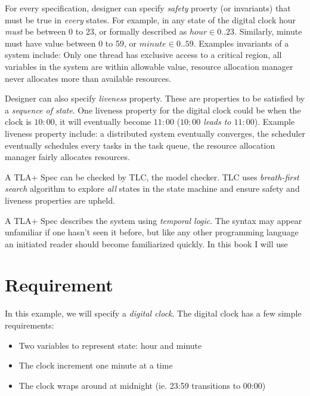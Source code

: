 \documentclass{report}
\begin{document}
For every specification, designer can specify \textit{safety} proerty (or
invariants) that must be true in \textit{every} states. For example, in any
state of the digital clock hour \textit{must} be between 0 to 23, or formally
described as $hour \in 0..23$. Similarly, minute must have value between 0 to
59, or $minute \in 0..59$. Examples invariants of a system include: Only one
thread has exclusive access to a critical region, all variables in the system
are within allowable value, resource allocation manager never allocates more
than available resources.\newline

Designer can also specify \textit{liveness} property. These are properties to be
satisfied by a \textit{sequence of state}. One liveness property for the digital
clock could be when the clock is $10:00$, it will eventually become $11:00$
(\textit{$10:00$ leads to $11:00$}). Example liveness property include: a
distributed system eventually converges, the scheduler eventually schedules
every tasks in the task queue, the resource allocation manager fairly allocates
resources. \newline

A TLA+ Spec can be checked by TLC, the model checker. TLC uses
\textit{breath-first search} algorithm to explore \textit{all} states in the
state machine and ensure safety and liveness properties are upheld.\newline

A TLA+ Spec describes the system using \textit{temporal logic}. The syntax may 
appear unfamiliar if one hasn't seen it before, but like any other programming 
language an initiated reader should become familiarized quickly. In this book I
will use 

\section{Requirement}

In this example, we will specify a \textit{digital clock}. The digital clock has
a few simple requirements:
\begin{itemize}
    \item Two variables to represent state: hour and minute
    \item The clock increment one minute at a time
    \item The clock wraps around at midnight (ie. 23:59 transitions to 00:00)
\end{itemize}
\end{document}
